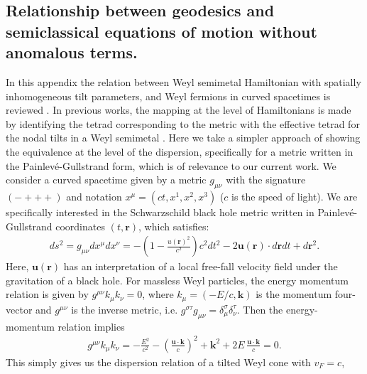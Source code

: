 \documentclass[submission, Phys]{SciPost}
\begin{document}
\begin{appendix}

\section{Relationship between geodesics and semiclassical equations of motion without anomalous terms.}

\label{sec:Geodesics}

In this appendix the relation between Weyl semimetal Hamiltonian with spatially inhomogeneous tilt parameters, and  Weyl fermions in curved spacetimes is reviewed \cite{Volovik2016,Volovik2017,Guan_2017,Weststrom_2017,Huang2018,Zubkov_2018,Liang2019,Kedem2020,Hashimoto2020,De_Beule_2021, Morice21,Sabsovich_2022}. In previous works, the mapping at the level of Hamiltonians is made by identifying the tetrad corresponding to the metric with the effective tetrad for the nodal tilts in a Weyl semimetal \cite{Volovik2016,Volovik2017,Weststrom_2017,De_Beule_2021}. Here we take a simpler approach of showing the equivalence at the level of the dispersion, specifically for a metric written in the Painlev\'e-Gullstrand form, which is of relevance to our current work. 
We consider a curved spacetime given by a  metric $g_{\mu \nu}$ with the signature $(-+++)$ and notation $x^\mu=(ct,x^1,x^2,x^3)$ ($c$ is the speed of light). We are specifically interested in the Schwarzschild black hole metric written in Painlev\'e-Gullstrand coordinates $(t,\bm{r})$, which satisfies:
\begin{align}
    ds^2=g_{\mu \nu} dx^\mu dx^\nu=-\left(1-\frac{u(\bm r)^2}{c^2} \right)c^2dt^2-2 \bm u(\bm r) \cdot d\bm r dt+ d\bm r^2.
\end{align}
Here, $\bm u (\bm r)$ has an interpretation of a local free-fall velocity field under the gravitation of a black hole.
For massless Weyl particles, the energy momentum relation is given by $g^{\mu \nu}k_\mu k_\nu=0$, where $k_\mu=(-E/c,\bm k)$ is the momentum four-vector and $g^{\mu\nu}$ is the inverse metric, i.e. $g^{\sigma\tau}g_{\mu\nu}=\delta_\mu^\sigma\delta_\nu^\tau$.
Then the energy-momentum relation implies
\begin{align}
    g^{\mu \nu}k_\mu k_\nu= -\frac{E^2}{c^2}-\left(\frac{\bm{u}\cdot\bm{k}}{c}\right)^2+\bm{k}^2+2E\,\frac{\bm{u}\cdot\bm{k}}{c}=0.
    \label{eq:energy_momentum_relation}
\end{align}
This simply gives us the dispersion relation of a tilted Weyl cone with $v_F=c$,
\begin{align}

\end{align}
\end{appendix}
\end{document}
